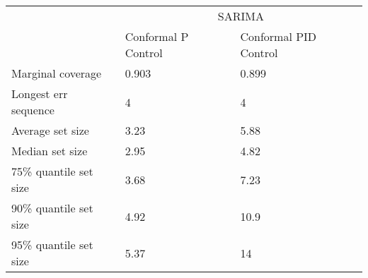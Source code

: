 \begin{tabular}{lll}
\toprule
& \multicolumn{2}{c}{SARIMA} \\
& Conformal P Control & Conformal PID Control \\
\midrule
Marginal coverage & 0.903 & 0.899 \\
Longest err sequence & 4 & 4 \\
Average set size & 3.23 & 5.88 \\
Median set size & 2.95 & 4.82 \\
75\% quantile set size & 3.68 & 7.23 \\
90\% quantile set size & 4.92 & 10.9 \\
95\% quantile set size & 5.37 & 14 \\
\bottomrule
\end{tabular}
